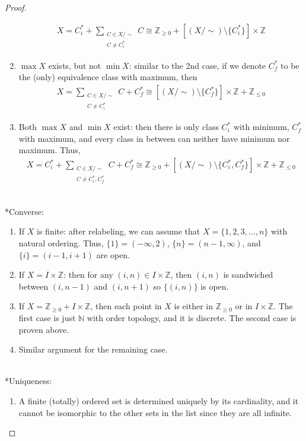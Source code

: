 \documentclass{treatise}
\begin{document}
\begin{proof}
\begin{enumerate}
    \begin{align*}
        X = C_i^* + \sum_{\substack{C \in X / \sim \\ C \neq C_i^*}} C \cong \mathbb{Z}_{\geq 0} + [(X / \sim) \setminus \{ C_i^* \}] \times \mathbb{Z}
    \end{align*}
    \item $\max X$ exists, but not $\min X$: similar to the 2nd case, if we denote $C_f^*$ to be the (only) equivalence class with maximum, then
    \begin{align*}
        X = \sum_{\substack{C \in X / \sim \\ C \neq C_i^*}} C + C_f^* \cong [(X / \sim) \setminus \{ C_f^* \}] \times \mathbb{Z} + \mathbb{Z}_{\leq 0}
    \end{align*}
    \item Both $\max X$ and $\min X$ exist: then there is only class $C_i^*$ with minimum, $C_f^*$ with maximum, and every class in between can neither have minimum nor maximum. Thus,
    \begin{align*}
        X = C_i^* + \sum_{\substack{C \in X / \sim \\ C \neq C_i^*, C_f^*}} C + C_f^* \cong \mathbb{Z}_{\geq 0} + [(X / \sim) \setminus \{ C_i^*, C_f^* \}] \times \mathbb{Z} + \mathbb{Z}_{\leq 0}
    \end{align*}
\end{enumerate}
\ \\
*Converse:
\begin{enumerate}
    \item If $X$ is finite: after relabeling, we can assume that $X = \{ 1, 2, 3, \hdots, n \}$ with natural ordering. Thus, $\{ 1 \} = (-\infty, 2)$, $\{ n \} = (n - 1, \infty)$, and $\{ i \} = (i-1, i+1)$ are open.
    \item If $X = I \times \mathbb{Z}$: then for any $(i, n) \in I \times \mathbb{Z}$, then $(i, n)$ is sandwiched between $(i, n-1)$ and $(i, n+1)$ so $\{ (i, n) \}$ is open.
    \item If $X = \mathbb{Z}_{\geq 0} + I \times \mathbb{Z}$, then each point in $X$ is either in $\mathbb{Z}_{\geq 0}$ or in $I \times \mathbb{Z}$. The first case is just $\mathbb{N}$ with order topology, and it is discrete. The second case is proven above.
    \item Similar argument for the remaining case.
\end{enumerate}
\ \\
*Uniqueness:
\begin{enumerate}
    \item A finite (totally) ordered set is determined uniquely by its cardinality, and it cannot be isomorphic to the other sets in the list since they are all infinite.

\end{enumerate}
\end{proof}
\end{document}
